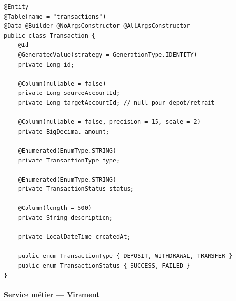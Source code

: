 \documentclass[12pt,a4paper]{article}
\begin{document}
\begin{lstlisting}[style=javastyle, caption={Transaction.java --- Entité JPA}, label=lst:transaction]
@Entity
@Table(name = "transactions")
@Data @Builder @NoArgsConstructor @AllArgsConstructor
public class Transaction {
    @Id
    @GeneratedValue(strategy = GenerationType.IDENTITY)
    private Long id;

    @Column(nullable = false)
    private Long sourceAccountId;
    private Long targetAccountId; // null pour depot/retrait

    @Column(nullable = false, precision = 15, scale = 2)
    private BigDecimal amount;

    @Enumerated(EnumType.STRING)
    private TransactionType type;

    @Enumerated(EnumType.STRING)
    private TransactionStatus status;

    @Column(length = 500)
    private String description;

    private LocalDateTime createdAt;

    public enum TransactionType { DEPOSIT, WITHDRAWAL, TRANSFER }
    public enum TransactionStatus { SUCCESS, FAILED }
}
\end{lstlisting}

\paragraph{Service métier --- Virement}
\end{document}

